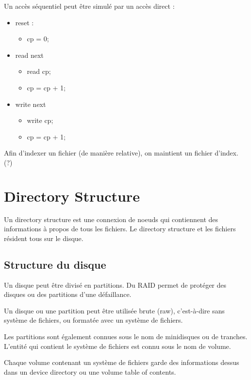 Un accès séquentiel peut être simulé par un accès direct :

\begin{itemize}
	\item reset :
	\begin{itemize}
		\item cp = 0;
	\end{itemize}
	
	\item read next
	\begin{itemize}
		\item read cp;
		\item cp = cp + 1;
	\end{itemize}
	
	\item write next
	\begin{itemize}
		\item write cp;
		\item cp = cp + 1;
	\end{itemize}
\end{itemize}

Afin d'indexer un fichier (de manière relative), on maintient un fichier d'index. (?)


\section{Directory Structure}

Un directory structure est une connexion de noeuds qui contiennent des informations à propos de tous les fichiers. Le directory structure et les fichiers résident tous sur le disque.

	\subsection{Structure du disque}
	
	Un disque peut être divisé en partitions. Du RAID permet de protéger des disques ou des partitions d'une défaillance.
	
	Un disque ou une partition peut être utilisée brute (raw), c'est-à-dire sans système de fichiers, ou formatée avec un système de fichiers.
	
	Les partitions sont également connues sous le nom de minidisques ou de tranches. L'entité qui contient le système de fichiers est connu sous le nom de volume.
	
	Chaque volume contenant un système de fichiers garde des informations dessus dans un device directory ou une volume table of contents.
	
